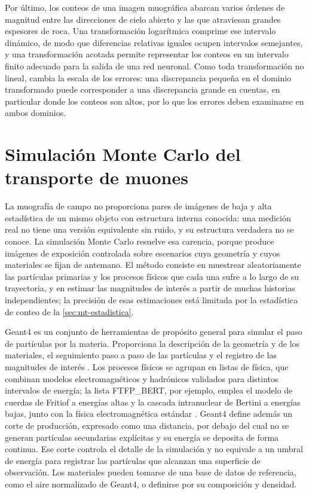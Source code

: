 Por último, los conteos de una imagen muográfica abarcan varios órdenes de magnitud entre las direcciones de cielo abierto y las que atraviesan grandes espesores de roca. Una transformación logarítmica comprime ese intervalo dinámico, de modo que diferencias relativas iguales ocupen intervalos semejantes, y una transformación acotada permite representar los conteos en un intervalo finito adecuado para la salida de una red neuronal. Como toda transformación no lineal, cambia la escala de los errores: una discrepancia pequeña en el dominio transformado puede corresponder a una discrepancia grande en cuentas, en particular donde los conteos son altos, por lo que los errores deben examinarse en ambos dominios.

\section{Simulación Monte Carlo del transporte de muones}
\label{sec:mt-simulacion}

La muografía de campo no proporciona pares de imágenes de baja y alta estadística de un mismo objeto con estructura interna conocida: una medición real no tiene una versión equivalente sin ruido, y su estructura verdadera no se conoce. La simulación Monte Carlo resuelve esa carencia, porque produce imágenes de exposición controlada sobre escenarios cuya geometría y cuyos materiales se fijan de antemano. El método consiste en muestrear aleatoriamente las partículas primarias y los procesos físicos que cada una sufre a lo largo de su trayectoria, y en estimar las magnitudes de interés a partir de muchas historias independientes; la precisión de esas estimaciones está limitada por la estadística de conteo de la \cref{sec:mt-estadistica}.

Geant4 es un conjunto de herramientas de propósito general para simular el paso de partículas por la materia. Proporciona la descripción de la geometría y de los materiales, el seguimiento paso a paso de las partículas y el registro de las magnitudes de interés \parencite{agostinelli2003,allison2016}. Los procesos físicos se agrupan en listas de física, que combinan modelos electromagnéticos y hadrónicos validados para distintos intervalos de energía; la lista FTFP\_BERT, por ejemplo, emplea el modelo de cuerdas de Fritiof a energías altas y la cascada intranuclear de Bertini a energías bajas, junto con la física electromagnética estándar \parencite{allison2016}. Geant4 define además un corte de producción, expresado como una distancia, por debajo del cual no se generan partículas secundarias explícitas y su energía se deposita de forma continua. Ese corte controla el detalle de la simulación y no equivale a un umbral de energía para registrar las partículas que alcanzan una superficie de observación. Los materiales pueden tomarse de una base de datos de referencia, como el aire normalizado de Geant4, o definirse por su composición y densidad.

